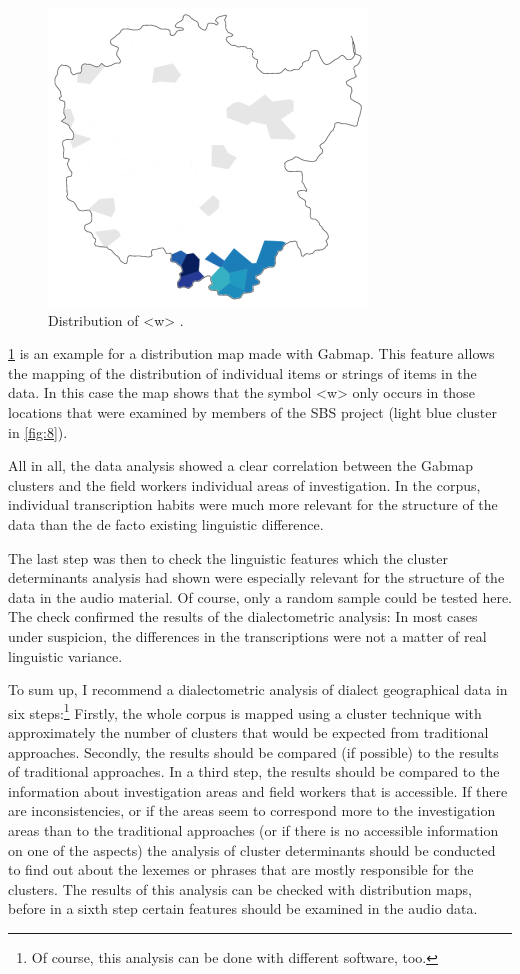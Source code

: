 \documentclass[output=paper]{LSP/langsci}
\begin{document}
\begin{figure}
\includegraphics[width=.5\textwidth]{illustrations/mathus_fig10}
\caption{Distribution of {\textless}w{\textgreater} \citep[226]{mathussek_sprachraume_2014}.}
\label{fig:10}
\end{figure}
  
\ref{fig:10} is an example for a distribution map made with Gabmap. This feature allows the mapping of the distribution of individual items or strings of items in the data. In this case the map shows that the symbol {\textless}w{\textgreater} only occurs in those locations that were examined by members of the SBS project (light blue cluster in \ref{fig:8}).

All in all, the data analysis showed a clear correlation between the Gabmap clusters and the field workers{\textquotesingle} individual areas of investigation. In the corpus, individual transcription habits were much more relevant for the structure of the data than the de facto existing linguistic difference.

The last step was then to check the linguistic features which the cluster determinants analysis had shown were especially relevant for the structure of the data in the audio material. Of course, only a random sample could be tested here. The check confirmed the results of the dialectometric analysis: In most cases under suspicion, the differences in the transcriptions were not a matter of real linguistic variance.

To sum up, I recommend a dialectometric analysis of dialect geographical data in six steps:\footnote{Of course, this analysis can be done with different software, too.} Firstly, the whole corpus is mapped using a cluster technique with approximately the number of clusters that would be expected from traditional approaches. Secondly, the results should be compared (if possible) to the results of traditional approaches. In a third step, the results should be compared to the information about investigation areas and field workers that is accessible. If there are inconsistencies, or if the areas seem to correspond more to the investigation areas than to the traditional approaches (or if there is no accessible information on one of the aspects) the analysis of cluster determinants should be conducted to find out about the lexemes or phrases that are mostly {\textquotedbl}responsible{\textquotedbl} for the clusters. The results of this analysis can be checked with distribution maps, before in a sixth step certain features should be examined in the audio data.
\end{document}
